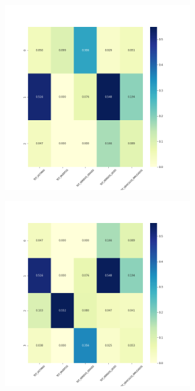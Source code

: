 \begin{figure}[H]
\begin{subfigure}{.5\textwidth}
  \centering
  \includegraphics[width=0.9\textwidth]{imagenes/case2/agglomerative/heatmaps/hm_agglomerative_case2_salida_k3.png}
\end{subfigure}%
\begin{subfigure}{.5\textwidth}
  \centering
  \includegraphics[width=0.9\textwidth]{imagenes/case2/agglomerative/heatmaps/hm_agglomerative_case2_salida_k4.png}

\end{subfigure}
\end{figure}
